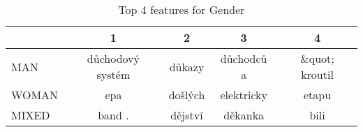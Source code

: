 \begin{table}
\centering
\caption{Top 4 features for Gender}
\label{tab:top4_authors_cum_gender}
\begin{tabular}{lcccc}
\toprule
{} &                 1 &        2 &           3 &               4 \\
\midrule
MAN   &  důchodový systém &   důkazy &  důchodců a &  \&quot; kroutil \\
WOMAN &               epa &  došlých &  elektricky &           etapu \\
MIXED &            band . &  dějství &     děkanka &            bili \\
\bottomrule
\end{tabular}
\end{table}
